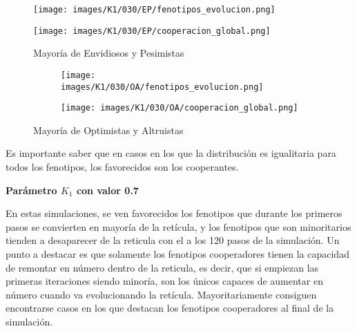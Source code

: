 \documentclass[a4paper,12pt]{report}
\begin{document}
\begin{figure}[h]
    \centering
    \begin{minipage}{0.49\textwidth}
    \centering
    \texttt{[image: images/K1/030/EP/fenotipos\_evolucion.png]}
    \label{fig:enter-label}
    \end{minipage}
    \hfill
    \begin{minipage}{0.49\textwidth}
    \centering
    \texttt{[image: images/K1/030/EP/cooperacion\_global.png]}
    \label{fig:enter-label}
    \end{minipage}
    \caption{Mayoría de Envidiosos y Pesimistas}
\end{figure}
\begin{figure}[h]
    \centering
    \begin{subfigure}[t]{0.49\textwidth}
        \centering
        \texttt{[image: images/K1/030/OA/fenotipos\_evolucion.png]}
        \label{fig:enter-label}
    \end{subfigure}
    \hfill
    \begin{subfigure}[t]{0.49\textwidth}
        \centering
        \texttt{[image: images/K1/030/OA/cooperacion\_global.png]}
        \label{fig:enter-label}
    \end{subfigure}
    \caption{Mayoría de Optimistas y Altruistas}
\end{figure}

Es importante saber que en casos en los que la distribución es igualitaria para todos los fenotipos, los favorecidos son los cooperantes.

\newpage

\vspace{1.5em}
\noindent\textbf{Parámetro \( K_1 \) con valor 0.7}
\vspace{0.5em}

En estas simulaciones, se ven favorecidos los fenotipos que durante los primeros pasos se convierten en mayoría de la retícula, y los fenotipos que son minoritarios tienden a desaparecer de la reticula con el a los 120 pasos de la simulación.
Un punto a destacar es que solamente los fenotipos cooperadores tienen la capacidad de remontar  en número dentro de la reticula, es decir, que si empiezan las primeras iteraciones siendo minoría, son los únicos capaces de aumentar en número cuando va evolucionando la retícula.
Mayoritariamente consiguen encontrarse casos en los que destacan los fenotipos cooperadores al final de la simulación.
\end{document}
